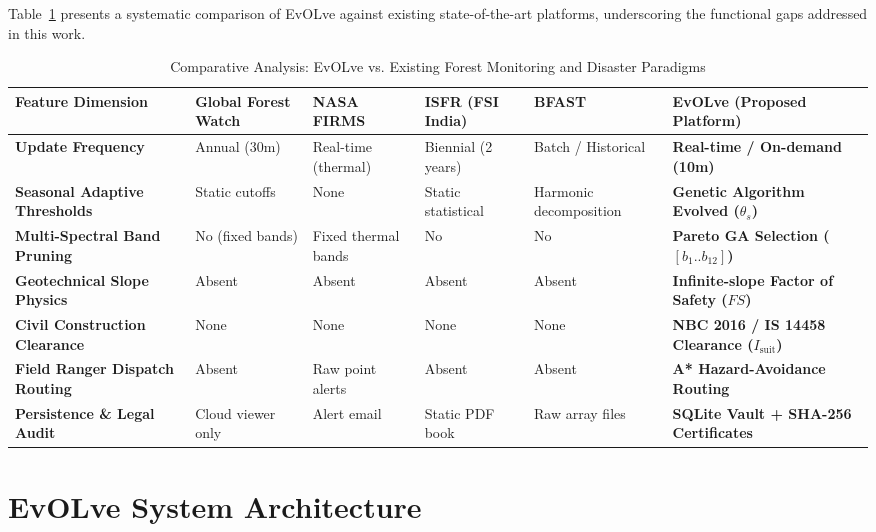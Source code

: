 \documentclass[conference]{IEEEtran}
\begin{document}
Table~\ref{tab:comparison} presents a systematic comparison of EvOLve against existing state-of-the-art platforms, underscoring the functional gaps addressed in this work.

\begin{table}[t]
\centering
\caption{Comparative Analysis: EvOLve vs. Existing Forest Monitoring and Disaster Paradigms}
\label{tab:comparison}
\renewcommand{\arraystretch}{1.2}
\footnotesize
\begin{tabular}{p{3.2cm}p{2.2cm}p{2.2cm}p{2.2cm}p{2.2cm}p{3.4cm}}
\toprule
\textbf{Feature Dimension} & \textbf{Global Forest Watch \cite{hansen2013high}} & \textbf{NASA FIRMS} & \textbf{ISFR (FSI India)} & \textbf{BFAST \cite{verbesselt2010detecting}} & \textbf{EvOLve (Proposed Platform)} \\
\midrule
\textbf{Update Frequency} & Annual (30m) & Real-time (thermal) & Biennial (2 years) & Batch / Historical & \textbf{Real-time / On-demand (10m)} \\
\textbf{Seasonal Adaptive Thresholds} & Static cutoffs & None & Static statistical & Harmonic decomposition & \textbf{Genetic Algorithm Evolved ($\theta_s$)} \\
\textbf{Multi-Spectral Band Pruning} & No (fixed bands) & Fixed thermal bands & No & No & \textbf{Pareto GA Selection ($[b_1..b_{12}]$)} \\
\textbf{Geotechnical Slope Physics} & Absent & Absent & Absent & Absent & \textbf{Infinite-slope Factor of Safety ($FS$)} \\
\textbf{Civil Construction Clearance} & None & None & None & None & \textbf{NBC 2016 / IS 14458 Clearance ($I_{\text{suit}}$)} \\
\textbf{Field Ranger Dispatch Routing} & Absent & Raw point alerts & Absent & Absent & \textbf{A* Hazard-Avoidance Routing} \\
\textbf{Persistence \& Legal Audit} & Cloud viewer only & Alert email & Static PDF book & Raw array files & \textbf{SQLite Vault + SHA-256 Certificates} \\
\bottomrule
\end{tabular}
\end{table}

\section{EvOLve System Architecture}
\end{document}
